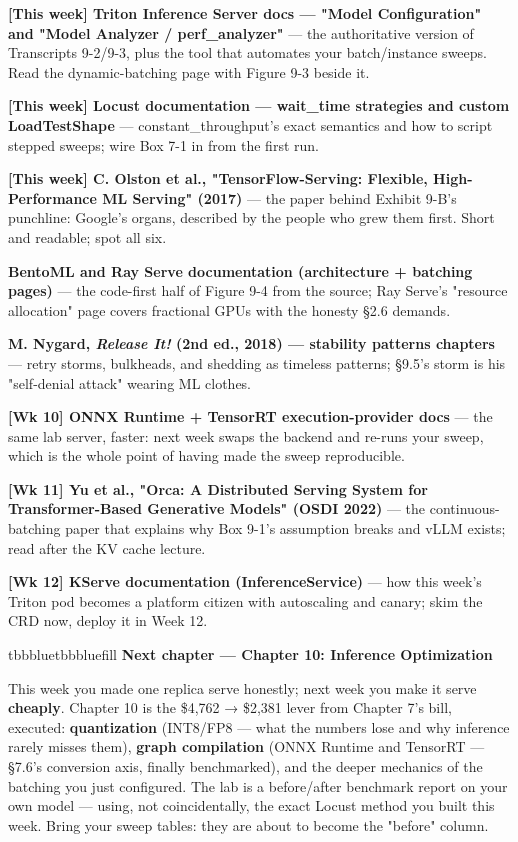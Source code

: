 \begin{tbbitemize}
  \item \textbf{[This week] Triton Inference Server docs — "Model Configuration" and "Model Analyzer / perf\_analyzer"} — the authoritative version of Transcripts 9-2/9-3, plus the tool that automates your batch/instance sweeps. Read the dynamic-batching page with Figure 9-3 beside it.
  \item \textbf{[This week] Locust documentation — wait\_time strategies and custom LoadTestShape} — constant\_throughput's exact semantics and how to script stepped sweeps; wire Box 7-1 in from the first run.
  \item \textbf{[This week] C. Olston et al., "TensorFlow-Serving: Flexible, High-Performance ML Serving" (2017)} — the paper behind Exhibit 9-B's punchline: Google's organs, described by the people who grew them first. Short and readable; spot all six.
  \item \textbf{BentoML and Ray Serve documentation (architecture + batching pages)} — the code-first half of Figure 9-4 from the source; Ray Serve's "resource allocation" page covers fractional GPUs with the honesty §2.6 demands.
  \item \textbf{M. Nygard, \textit{Release It!} (2nd ed., 2018) — stability patterns chapters} — retry storms, bulkheads, and shedding as timeless patterns; §9.5's storm is his "self-denial attack" wearing ML clothes.
  \item \textbf{[Wk 10] ONNX Runtime + TensorRT execution-provider docs} — the same lab server, faster: next week swaps the backend and re-runs your sweep, which is the whole point of having made the sweep reproducible.
  \item \textbf{[Wk 11] Yu et al., "Orca: A Distributed Serving System for Transformer-Based Generative Models" (OSDI 2022)} — the continuous-batching paper that explains why Box 9-1's assumption breaks and vLLM exists; read after the KV cache lecture.
  \item \textbf{[Wk 12] KServe documentation (InferenceService)} — how this week's Triton pod becomes a platform citizen with autoscaling and canary; skim the CRD now, deploy it in Week 12.
\end{tbbitemize}

\vspace{5.0pt}

\begin{calloutbox}{tbbblue}{tbbbluefill}
{\normalsize\bfseries\color{tbbblue}Next chapter — Chapter 10: Inference Optimization}\par\vspace{3pt}
This week you made one replica serve honestly; next week you make it serve \textbf{cheaply}. Chapter 10 is the \$4,762 → \$2,381 lever from Chapter 7's bill, executed: \textbf{quantization} (INT8/FP8 — what the numbers lose and why inference rarely misses them), \textbf{graph compilation} (ONNX Runtime and TensorRT — §7.6's conversion axis, finally benchmarked), and the deeper mechanics of the batching you just configured. The lab is a before/after benchmark report on your own model — using, not coincidentally, the exact Locust method you built this week. Bring your sweep tables: they are about to become the "before" column.
\end{calloutbox}
